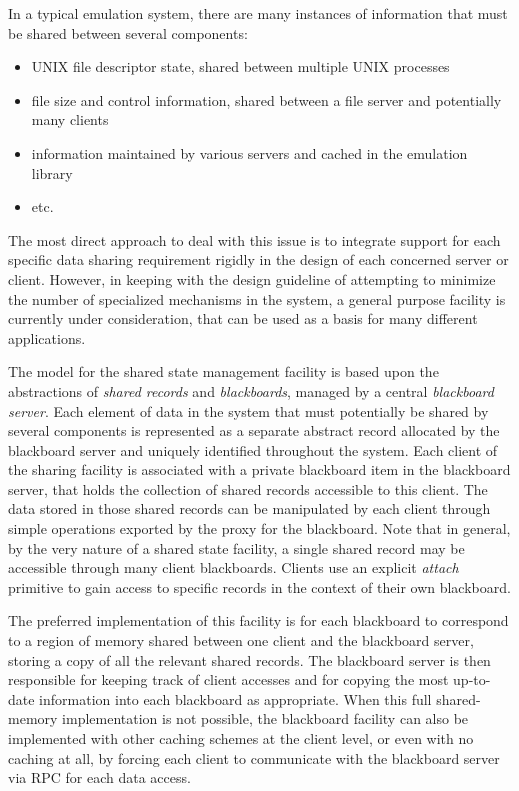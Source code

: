 In a typical emulation system, there are many instances of information
that must be shared between several components:
\begin{itemize}
\item UNIX file descriptor state, shared between multiple UNIX
processes

\item file size and control information, shared between a file server
and potentially many clients

\item information maintained by various servers and cached in the
emulation library

\item etc.
\end{itemize}
The most direct approach to deal with this issue is to integrate
support for each specific data sharing requirement rigidly in the
design of each concerned server or client. However, in keeping with
the design guideline of attempting to minimize the number of
specialized mechanisms in the system, a general purpose facility is
currently under consideration, that can be used as a basis for many
different applications.


The model for the shared state management facility is based upon the
abstractions of {\em shared records} and {\em blackboards}, managed by
a central {\em blackboard server}. Each element of data in the system
that must potentially be shared by several components is represented
as a separate abstract record allocated by the blackboard server and
uniquely identified throughout the system. Each client of the sharing
facility is associated with a private blackboard item in the
blackboard server, that holds the collection of shared records
accessible to this client. The data stored in those shared records can
be manipulated by each client through simple operations exported by
the proxy for the blackboard. Note that in general, by the very nature
of a shared state facility, a single shared record may be accessible
through many client blackboards. Clients use an explicit {\em attach}
primitive to gain access to specific records in the context of their
own blackboard.

The preferred implementation of this facility is for each blackboard
to correspond to a region of memory shared between one client and the
blackboard server, storing a copy of all the relevant shared records.
The blackboard server is then responsible for keeping track of client
accesses and for copying the most up-to-date information into each
blackboard as appropriate. When this full shared-memory implementation
is not possible, the blackboard facility can also be implemented with
other caching schemes at the client level, or even with no caching at
all, by forcing each client to communicate with the blackboard server
via RPC for each data access.



